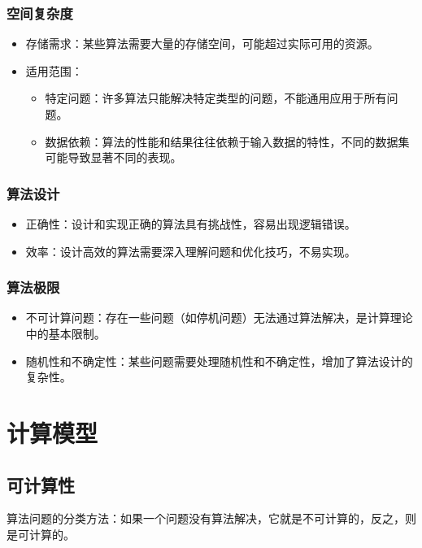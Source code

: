 \documentclass[UTF-8,a4paper,9pt]{article}
\begin{document}
\subsubsection*{空间复杂度}
\begin{itemize}
  \item 存储需求：某些算法需要大量的存储空间，可能超过实际可用的资源。
  \item 适用范围：
        \begin{itemize}
          \item 特定问题：许多算法只能解决特定类型的问题，不能通用应用于所有问题。
          \item 数据依赖：算法的性能和结果往往依赖于输入数据的特性，不同的数据集可能导致显著不同的表现。
        \end{itemize}
\end{itemize}

\subsubsection{算法设计}
\begin{itemize}
  \item 正确性：设计和实现正确的算法具有挑战性，容易出现逻辑错误。
  \item 效率：设计高效的算法需要深入理解问题和优化技巧，不易实现。
\end{itemize}

\subsubsection{算法极限}
\begin{itemize}
  \item 不可计算问题：存在一些问题（如停机问题）无法通过算法解决，是计算理论中的基本限制。
  \item 随机性和不确定性：某些问题需要处理随机性和不确定性，增加了算法设计的复杂性。
\end{itemize}

\section{计算模型}

\subsection{可计算性}

算法问题的分类方法：如果一个问题没有算法解决，它就是不可计算的，反之，则是可计算的。
\end{document}
